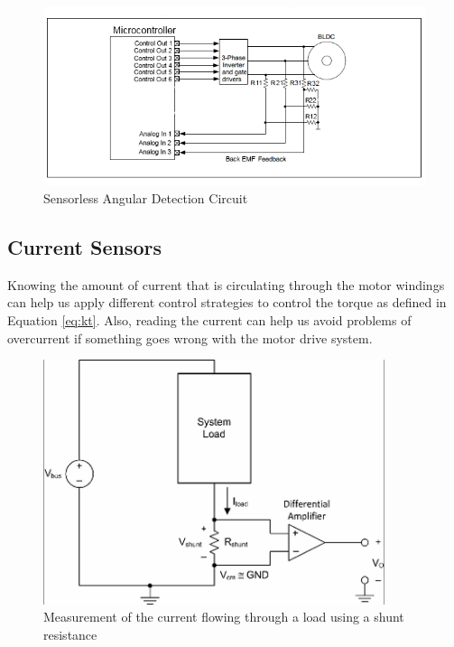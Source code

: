 \begin{figure}[htbp]
\centering
\includegraphics[width=\textwidth]{Images/sensorless_position.png} 
\caption[Sensorless Angular Detection]{Sensorless Angular Detection Circuit}
\label{fig:hall_effect}
\end{figure}

\subsection{Current Sensors}\label{subsection:current_sensors}

Knowing the amount of current that is circulating through the motor windings can help us apply different control strategies to control the torque as defined in Equation \ref{eq:kt}. Also, reading the current can help us avoid problems of overcurrent if something goes wrong with the motor drive system.

\begin{figure}[htbp]
\centering
\includegraphics[width=10cm]{Images/shunt_amp.png} 
\caption[Shunt Resistance Current Detection]{Measurement of the current flowing through a load using a shunt resistance}
\label{fig:shunt_amp}
\end{figure}

